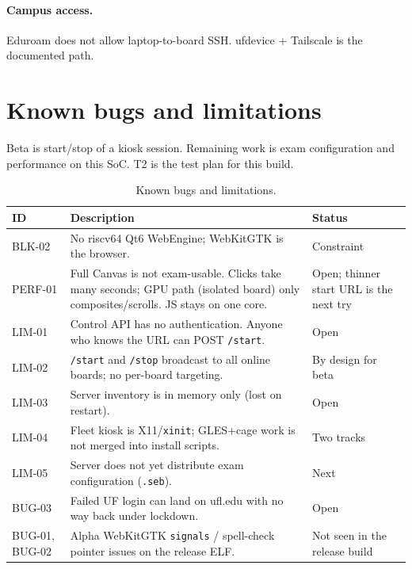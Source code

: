 \documentclass[11pt]{article}
\begin{document}
\paragraph{Campus access.}
Eduroam does not allow laptop-to-board SSH. ufdevice + Tailscale is the documented path.

\section{Known bugs and limitations}

Beta is start/stop of a kiosk session. Remaining work is exam configuration and performance on this SoC. T2 is the test plan for this build.

\begin{table}[H]
  \centering
  \footnotesize
  \begin{tabularx}{\textwidth}{@{}p{}X p{}@{}}
    \toprule
    \textbf{ID} & \textbf{Description} & \textbf{Status} \\
    \midrule
    BLK-02 &
    No riscv64 Qt6 WebEngine; WebKitGTK is the browser. &
    Constraint \\
    PERF-01 &
    Full Canvas is not exam-usable. Clicks take many seconds; GPU path (isolated board) only composites/scrolls. JS stays on one core. &
    Open; thinner start URL is the next try \\
    LIM-01 &
    Control API has no authentication. Anyone who knows the URL can POST \texttt{/start}. &
    Open \\
    LIM-02 &
    \texttt{/start} and \texttt{/stop} broadcast to all online boards; no per-board targeting. &
    By design for beta \\
    LIM-03 &
    Server inventory is in memory only (lost on restart). &
    Open \\
    LIM-04 &
    Fleet kiosk is X11/\texttt{xinit}; GLES+cage work is not merged into install scripts. &
    Two tracks \\
    LIM-05 &
    Server does not yet distribute exam configuration (\texttt{.seb}). &
    Next \\
    BUG-03 &
    Failed UF login can land on ufl.edu with no way back under lockdown. &
    Open \\
    BUG-01, BUG-02 &
    Alpha WebKitGTK \texttt{signals} / spell-check pointer issues on the release ELF. &
    Not seen in the release build \\
    \bottomrule
  \end{tabularx}
  \caption{Known bugs and limitations.}
  \label{tab:bugs}
\end{table}
\end{document}

